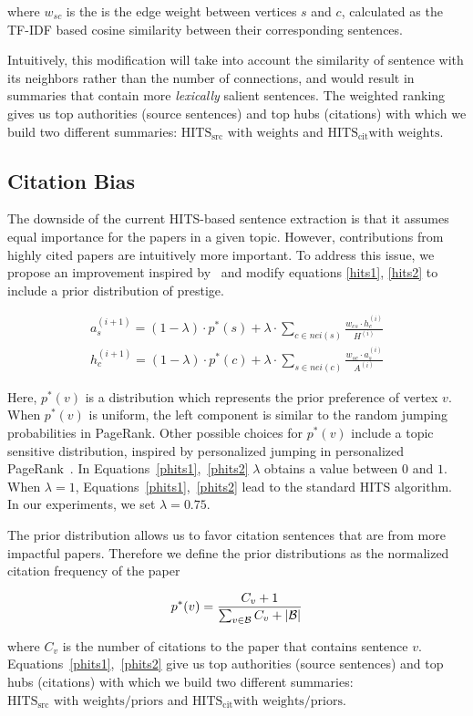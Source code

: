 where $w_{sc}$ is the is the edge weight between vertices $s$ and $c$, calculated as the TF-IDF based cosine similarity between their corresponding sentences.

Intuitively, this modification will take into account the similarity of sentence with its neighbors rather than the number of connections, and would result in summaries that contain more \emph{lexically} salient sentences. 
The weighted ranking gives us top authorities (source sentences) and top hubs (citations) with which we build two different summaries: {\bf $\textrm{HITS}_\textrm{src} \textrm{ with weights}$} and {\bf $\textrm{HITS}_\textrm{cit} \textrm{with weights}$}.

\subsection{Citation Bias}
The downside of the current HITS-based sentence extraction is that it assumes equal importance for the papers in a given topic. However, contributions from highly cited papers are intuitively more important. To address this issue, we propose an improvement inspired by~\cite{Mei&al2010} and modify equations \ref{hits1}, \ref{hits2} to include a prior distribution of prestige.

{\small
\begin{eqnarray}
\label{phits1} a^{(i+1)}_s = (1- \lambda) \cdot p^\ast(s) + \lambda \cdot \sum_{c\in nei(s)} \frac{w_{cs}\cdot h^{(i)}_c}{H^{(i)}}\\
\label{phits2} h^{(i+1)}_c = (1- \lambda) \cdot p^\ast(c) + \lambda \cdot \sum_{s\in nei(c)} \frac{w_{sc}\cdot a^{(i)}_s}{A^{(i)}}
\end{eqnarray}}

Here, $p^\ast(v)$ is a distribution which represents the prior preference of vertex $v$. When $p^\ast(v)$ is uniform, the left component is similar to the random jumping probabilities in PageRank. Other possible choices for $p^\ast(v)$ include a topic sensitive distribution, inspired by personalized jumping in personalized PageRank~\cite{Haveliwala2002,haveliwala2003topic}. 
In Equations~\ref{phits1},~\ref{phits2} $\lambda$ obtains a value between $0$ and $1$. When $\lambda = 1$, Equations~\ref{phits1},~\ref{phits2} lead to the standard HITS algorithm. In our experiments, we set $\lambda = 0.75$. 

The prior distribution allows us to favor citation sentences that are from more impactful papers. Therefore we define the prior distributions as the normalized citation frequency of the paper 

{\small
\begin{eqnarray}
p^\ast (v) = \frac{C_v + 1}{\sum_{v\in \B} C_v + |\B|} 
\end{eqnarray}}

where $C_v$ is the number of citations to the paper that contains sentence $v$.  
Equations~\ref{phits1},~\ref{phits2} give us top authorities (source sentences) and top hubs (citations) with which we build two different summaries:  {\bf $\textrm{HITS}_\textrm{src} \textrm{ with weights/priors}$} and {\bf $\textrm{HITS}_\textrm{cit} \textrm{with weights/priors}$}. 

